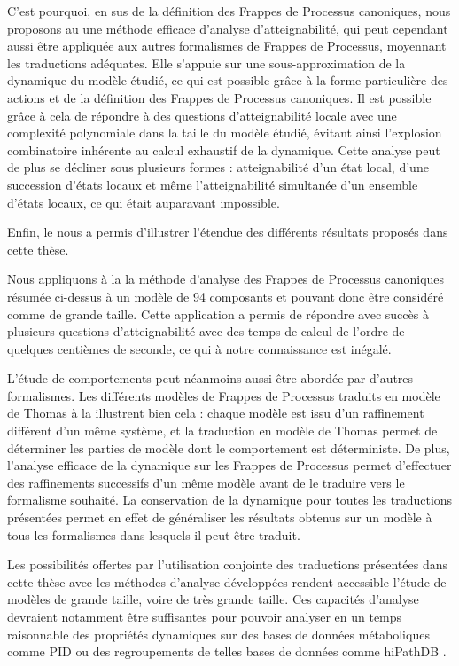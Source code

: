 C'est pourquoi, en sus de la définition des Frappes de Processus canoniques,
nous proposons au  une méthode efficace d'analyse d'atteignabilité,
qui peut cependant aussi être appliquée aux autres formalismes
de Frappes de Processus, moyennant les traductions adéquates.
Elle s'appuie sur une sous-approximation de la dynamique du modèle étudié,
ce qui est possible grâce à la forme particulière des actions et de la définition
des Frappes de Processus canoniques.
Il est possible grâce à cela de répondre à des questions d'atteignabilité locale
avec une complexité polynomiale dans la taille du modèle étudié,
évitant ainsi l'explosion combinatoire inhérente au calcul exhaustif de la dynamique.
Cette analyse peut de plus se décliner sous plusieurs formes :
atteignabilité d'un état local, d'une succession d'états locaux
et même l'atteignabilité simultanée d'un ensemble d'états locaux,
ce qui était auparavant impossible.

\myskip

Enfin, le  nous a permis d'illustrer l'étendue
des différents résultats proposés dans cette thèse.

Nous appliquons à la  la méthode d'analyse des
Frappes de Processus canoniques résumée ci-dessus
à un modèle de 94 composants et pouvant donc être considéré comme de grande taille.
Cette application a permis de répondre avec succès à plusieurs questions d'atteignabilité
avec des temps de calcul de l'ordre de quelques centièmes de seconde,
ce qui à notre connaissance est inégalé.

L'étude de comportements peut néanmoins aussi être abordée par d'autres formalismes.
Les différents modèles de Frappes de Processus traduits en modèle de Thomas
à la  illustrent bien cela :
chaque modèle est issu d'un raffinement différent d'un même système,
et la traduction en modèle de Thomas permet de déterminer
les parties de modèle dont le comportement est déterministe.
De plus, l'analyse efficace de la dynamique sur les Frappes de Processus
permet d'effectuer des raffinements successifs d'un même modèle
avant de le traduire vers le formalisme souhaité.
La conservation de la dynamique %
pour toutes les traductions présentées
permet en effet de généraliser les résultats obtenus sur un modèle à tous les formalismes
dans lesquels il peut être traduit.

\myskip

Les possibilités offertes par l'utilisation conjointe des traductions présentées
dans cette thèse avec les méthodes d'analyse développées
rendent accessible l'étude de modèles de grande taille, voire de très grande taille.
Ces capacités d'analyse devraient notamment être suffisantes pour pouvoir analyser
en un temps raisonnable des propriétés dynamiques sur des bases de données métaboliques
comme PID \cite{schaefer09pid}
ou des regroupements de telles bases de données comme hiPathDB \cite{yu12hipathdb}.


